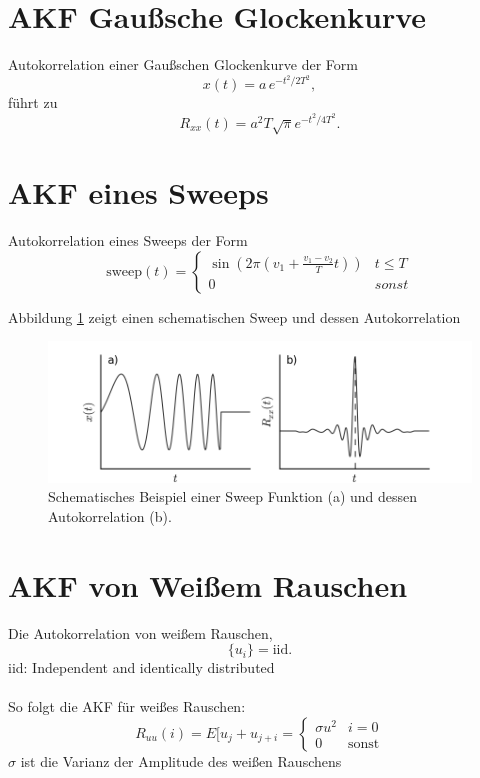 \section*{AKF Gaußsche Glockenkurve}
Autokorrelation einer Gaußschen Glockenkurve der Form
\[
x(t) = a\,e^{-t^2/2T^2},
\]
führt zu
\[
R_{xx}(t) = a^2 T \sqrt{\pi} e^{-t^2/4T^2}.
\]

\section*{AKF eines Sweeps}
Autokorrelation eines Sweeps der Form
\[
\mbox{sweep}(t)=
\begin{cases}
\sin \left(2\pi \left(v_1 + \frac{v_1-v_2}{T} t \right)\right) & t \leq T\\
0& sonst
\end{cases}
\]

Abbildung \ref{fig:korr_sweep} zeigt einen schematischen Sweep und dessen Autokorrelation

\begin{figure}[h!]
\centering
\includegraphics[width=.9\tw]{fig/09-Korrelation/04-example_sweep.png}
\caption{Schematisches Beispiel einer Sweep Funktion (a) und dessen Autokorrelation (b).}
\label{fig:korr_sweep}
\end{figure}

\section*{AKF von Weißem Rauschen}
Die Autokorrelation von weißem Rauschen,
\[
\{u_i\} = \mbox{iid}.
\]
{\small iid: Independent and identically distributed}\\\\
So folgt die AKF für weißes Rauschen:
\[
R_{uu}(i) = E[u_j + u_{j+i} =
\begin{cases}
\sigma u^2 & i=0\\
0 & \mbox{sonst}
\end{cases}
\]
{\small $\sigma$ ist die Varianz der Amplitude des weißen Rauschens}

